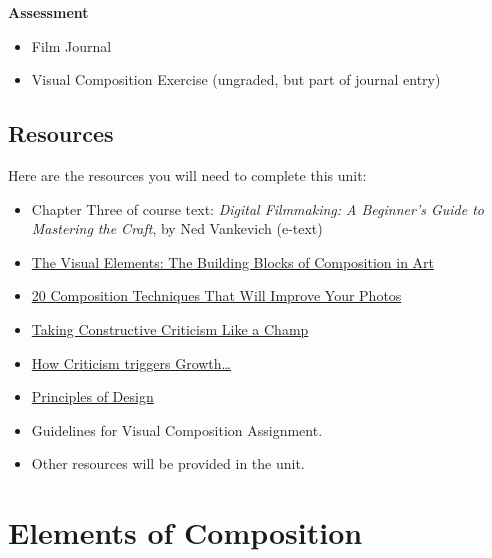 \documentclass[
]{book}
\providecommand{\tightlist}{%
  \setlength{\itemsep}{0pt}\setlength{\parskip}{0pt}}
\begin{document}
\textbf{Assessment}

\begin{itemize}
\tightlist
\item
  Film Journal\\
\item
  Visual Composition Exercise (ungraded, but part of journal entry)
\end{itemize}

\hypertarget{resources-2}{%
\subsection*{Resources}\label{resources-2}}

Here are the resources you will need to complete this unit:

\begin{itemize}
\tightlist
\item
  Chapter Three of course text: \emph{Digital Filmmaking: A Beginner's Guide to Mastering the Craft}, by Ned Vankevich (e-text)\\
\item
  \href{http://www.artyfactory.com/art_appreciation/visual-elements/visual-elements.html}{The Visual Elements: The Building Blocks of Composition in Art}\\
\item
  \href{https://petapixel.com/2016/09/14/20-composition-techniques-will-improve-photos/}{20 Composition Techniques That Will Improve Your Photos}\\
\item
  \href{https://www.themuse.com/advice/taking-constructive-criticism-like-a-champ}{Taking Constructive Criticism Like a Champ}\\
\item
  \href{https://artplusmarketing.com/how-criticism-triggers-growth-52d775e97557}{How Criticism triggers Growth\ldots{}}\\
\item
  \href{https://www.getty.edu/education/teachers/building_lessons/principles_design.pdf}{Principles of Design}\\
\item
  Guidelines for Visual Composition Assignment.\\
\item
  Other resources will be provided in the unit.
\end{itemize}

\hypertarget{elements-of-composition}{%
\section{Elements of Composition}\label{elements-of-composition}}
\end{document}

